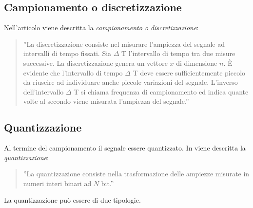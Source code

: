 \documentclass[a4paper]{report} %
\begin{document}
\subsection{Campionamento o discretizzazione}
Nell'articolo \cite{art:rif.2} viene descritta la \textit{campionamento o discretizzazione}:
\begin{quote}
	''La discretizzazione consiste nel misurare l'ampiezza del segnale ad intervalli di tempo fissati. Sia $\Delta$ T l'intervallo di tempo tra due misure successive. La discretizzazione genera un vettore $x$ di dimensione $n$. È evidente che l'intervallo di tempo $\Delta$ T deve essere sufficientemente piccolo da riuscire ad individuare anche piccole variazioni del segnale. L'inverso dell'intervallo $\Delta$ T si chiama frequenza di campionamento ed indica quante volte al secondo viene misurata l'ampiezza del segnale.'' 
\end{quote}
  
\subsection{Quantizzazione}
Al termine del campionamento il segnale essere quantizzato. In \cite{art:rif.2} viene descritta la \textit{quantizzazione}:
\begin{quote}
	''La quantizzazione consiste nella trasformazione delle ampiezze misurate in numeri interi binari ad $N$ bit.'' 
\end{quote}
La quantizzazione può essere di due tipologie.
\end{document}
